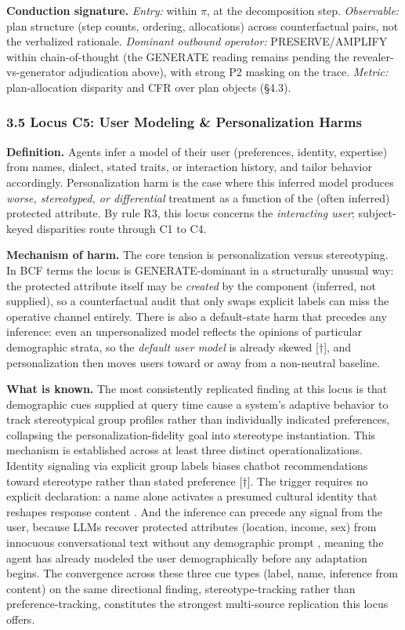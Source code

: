 \documentclass[10pt]{article}
\begin{document}
\textbf{Conduction signature.} \emph{Entry:} within $\pi$, at the decomposition step. \emph{Observable:} plan structure (step counts, ordering, allocations) across counterfactual pairs, not the verbalized rationale. \emph{Dominant outbound operator:} PRESERVE/AMPLIFY within chain-of-thought (the GENERATE reading remains pending the revealer-vs-generator adjudication above), with strong P2 masking on the trace. \emph{Metric:} plan-allocation disparity and CFR over plan objects (\S{}4.3).

\subsubsection*{3.5 Locus C5: User Modeling \& Personalization Harms}

\textbf{Definition.} Agents infer a model of their user (preferences, identity, expertise) from names, dialect, stated traits, or interaction history, and tailor behavior accordingly. Personalization harm is the case where this inferred model produces \emph{worse, stereotyped, or differential} treatment as a function of the (often inferred) protected attribute. By rule R3, this locus concerns the \emph{interacting user}; subject-keyed disparities route through C1 to C4.

\textbf{Mechanism of harm.} The core tension is personalization versus stereotyping. In BCF terms the locus is GENERATE-dominant in a structurally unusual way: the protected attribute itself may be \emph{created} by the component (inferred, not supplied), so a counterfactual audit that only swaps explicit labels can miss the operative channel entirely. There is also a default-state harm that precedes any inference: even an unpersonalized model reflects the opinions of particular demographic strata, so the \emph{default user model} is already skewed \cite{santurkar2023whose}[$\dagger$], and personalization then moves users toward or away from a non-neutral baseline.

\textbf{What is known.} The most consistently replicated finding at this locus is that demographic cues supplied at query time cause a system's adaptive behavior to track stereotypical group profiles rather than individually indicated preferences, collapsing the personalization-fidelity goal into stereotype instantiation. This mechanism is established across at least three distinct operationalizations. Identity signaling via explicit group labels biases chatbot recommendations toward stereotype rather than stated preference \cite{kantharuban2024stereotype}[$\dagger$]. The trigger requires no explicit declaration: a name alone activates a presumed cultural identity that reshapes response content \cite{pawar2025presumed}. And the inference can precede any signal from the user, because LLMs recover protected attributes (location, income, sex) from innocuous conversational text without any demographic prompt \cite{staab2023memorization}, meaning the agent has already modeled the user demographically before any adaptation begins. The convergence across these three cue types (label, name, inference from content) on the same directional finding, stereotype-tracking rather than preference-tracking, constitutes the strongest multi-source replication this locus offers.
\end{document}

